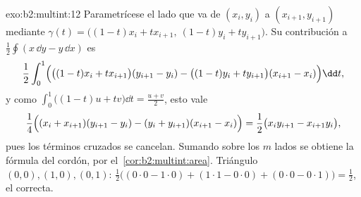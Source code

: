 \begin{solution}{exo:b2:multint:12}
Parametrícese el lado que va de $(x_i, y_i)$ a $(x_{i+1}, y_{i+1})$
mediante $\gamma(t) = \bigl((1-t)x_i + tx_{i+1},\ (1-t)y_i +
ty_{i+1}\bigr)$. Su contribución a $\frac12\oint(x\,\dd y - y\,\dd
x)$ es
\[
\frac12\int_0^1\Bigl(\bigl((1-t)x_i +
tx_{i+1}\bigr)(y_{i+1} - y_i) - \bigl((1-t)y_i +
ty_{i+1}\bigr)(x_{i+1} - x_i)\Bigr)\dd t ,
\]
y como $\int_0^1\bigl((1-t)u + tv\bigr)\dd t = \frac{u + v}2$, esto
vale
\[
\frac14\Bigl((x_i + x_{i+1})(y_{i+1} - y_i) - (y_i +
y_{i+1})(x_{i+1} - x_i)\Bigr)
= \frac12\bigl(x_iy_{i+1} - x_{i+1}y_i\bigr),
\]
pues los términos cruzados se cancelan. Sumando sobre los $m$ lados
se obtiene la fórmula del cordón, por el~\cref{cor:b2:multint:area}.
Triángulo $(0,0), (1,0), (0,1)$: $\frac12\bigl((0\cdot0 - 1\cdot0) +
(1\cdot1 - 0\cdot0) + (0\cdot0 - 0\cdot1)\bigr) = \frac12$, el 
correcta.
\end{solution}

